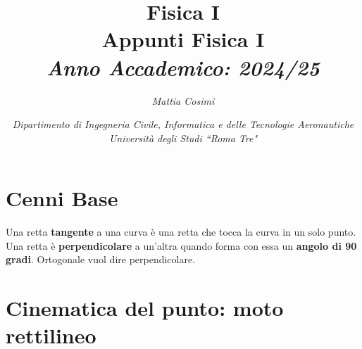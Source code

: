 \documentclass{article}
\numberwithin{equation}{subsection}
\begin{document}
\title{%
    \textbf{Fisica I}  \\ 
    \large Appunti Fisica I\\
    \textit{Anno Accademico: 2024/25}}
\author{\textit{Mattia Cosimi}}
\date{\textit{Dipartimento di Ingegneria Civile, Informatica e delle Tecnologie Aeronautiche \\
Università degli Studi ``Roma Tre"}}

\maketitle


\clearpage

\pagestyle{fancy}
\fancyhead{}\fancyfoot{}
\fancyfoot[C]{\thepage}

\tableofcontents

\clearpage

\section{Cenni Base}
Una retta \textbf{tangente} a una curva è una retta che tocca la curva in un solo punto. Una retta è \textbf{perpendicolare} a un'altra quando forma con essa un \textbf{angolo di 90 gradi}. Ortogonale vuol dire perpendicolare.
\section{Cinematica del punto: moto rettilineo}
\end{document}
